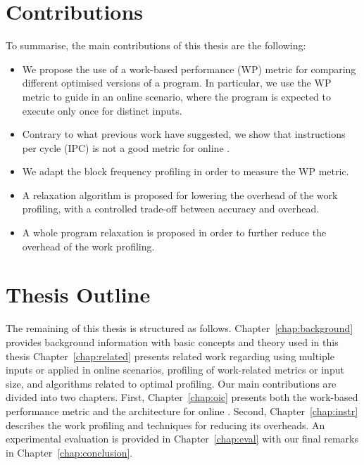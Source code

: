 \section{Contributions}


To summarise, the main contributions of this thesis are the following:
\begin{itemize}
\item We propose the use of a work-based performance (WP) metric for comparing different optimised versions of a program.
      In particular, we use the WP metric to guide {\itercomp} in an online scenario, where the program is expected to execute only once for distinct inputs.
       
\item Contrary to what previous work have suggested, we show that instructions per cycle (IPC) is not a good metric for online {\itercomp}.
\item We adapt the block frequency profiling in order to measure the WP metric.
\item A relaxation algorithm is proposed for lowering the overhead of the work profiling, with a controlled trade-off between accuracy and overhead.
\item A whole program relaxation is proposed in order to further reduce the overhead of the work profiling.
\end{itemize}

\section{Thesis Outline}

The remaining of this thesis is structured as follows.
Chapter~\ref{chap:background} provides background information with basic concepts and theory used in this thesis
Chapter~\ref{chap:related} presents related work regarding {\itercomp} using multiple inputs or applied in online scenarios,
profiling of work-related metrics or input size, and algorithms related to optimal profiling.
Our main contributions are divided into two chapters.
First, Chapter~\ref{chap:oic} presents both the work-based performance metric and the architecture for online {\itercomp}.
Second, Chapter~\ref{chap:instr} describes the work profiling and techniques for reducing its overheads.
An experimental evaluation is provided in Chapter~\ref{chap:eval} with our final remarks in Chapter~\ref{chap:conclusion}.
